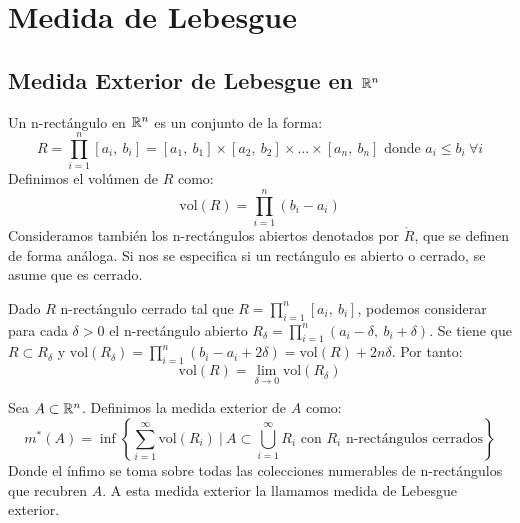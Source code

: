 
\section{Medida de Lebesgue}

\subsection{Medida Exterior de Lebesgue en $\mathbb{R}^n$}

\begin{definición}
Un n-rectángulo en $\mathbb{R}^n$ es un conjunto de la forma:
\begin{equation}
    R = \prod_{i=1}^n [a_i, \ b_i] = [a_1, \ b_1] \times [a_2, \ b_2] \times ... \times [a_n, \ b_n] \text{ donde } a_i \leq b_i \ \forall i
\end{equation}
Definimos el volúmen de $R$ como:
\begin{equation}
    \text{vol}(R) = \prod_{i=1}^n (b_i - a_i)
\end{equation}
Consideramos también los n-rectángulos abiertos denotados por $\mathring{R}$, que se definen de forma análoga. Si nos se especifica si un rectángulo es abierto o cerrado, se asume que es cerrado.
\end{definición}

\begin{observación}
Dado $R$ n-rectángulo cerrado tal que $R = \prod_{i=1}^n [a_i, \ b_i]$, podemos considerar para cada $\delta > 0$ el n-rectángulo abierto $R_\delta = \prod_{i=1}^n (a_i - \delta, \ b_i + \delta)$. Se tiene que $R \subset R_\delta$ y $\text{vol}(R_\delta) = \prod_{i=1}^n (b_i - a_i + 2\delta) = \text{vol}(R) + 2n\delta$. Por tanto:
\begin{equation}
    \text{vol}(R) = \lim_{\delta \to 0} \text{vol}(R_\delta)
\end{equation}
\end{observación}

\begin{definición}
Sea $A \subset \mathbb{R}^n$. Definimos la medida exterior de $A$ como:
\begin{equation}
    m^*(A) = \inf \left\{ \sum_{i=1}^\infty \text{vol}(R_i) \ | \ A \subset \bigcup_{i=1}^\infty R_i \text{ con } R_i \text{ n-rectángulos cerrados} \right\}
\end{equation}
Donde el ínfimo se toma sobre todas las colecciones numerables de n-rectángulos que recubren $A$. A esta medida exterior la llamamos medida de Lebesgue exterior.
\end{definición}

